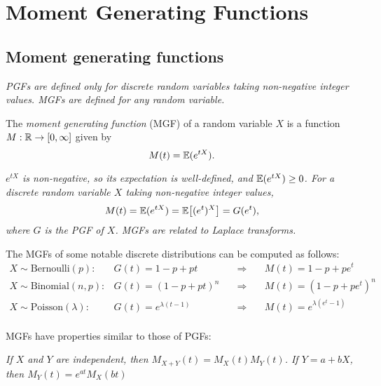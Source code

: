 \chapter{Moment Generating Functions}\label{chap:mgfs}
\section{Moment generating functions}

\bit
\it PGFs are defined only for discrete random variables taking non-negative integer values. 
\it MGFs are defined for any random variable.
\eit

\begin{definition}
The \emph{moment generating function} (MGF) of a random variable $X$ is a function $M:\mathbb{R}\to [0,\infty]$ given by
\[
M(t) = \mathbb{E}(e^{tX}).
\] 
\end{definition}

\begin{remark}
\ben
\it $e^{tX}$ is non-negative, so its expectation is well-defined, and $\mathbb{E}(e^{tX})\geq 0$.
\it
For a discrete random variable $X$ taking non-negative integer values, 
\[
M(t) = \mathbb{E}(e^{tX}) = \mathbb{E}\big[(e^t)^X\big] = G(e^t),
\]
where $G$ is the PGF of $X$.
\it 
MGFs are related to \emph{Laplace transforms}.
\een
\end{remark}

\begin{example}
The MGFs of some notable discrete distributions can be computed as follows:
\[
\begin{array}{llll}
X\sim\text{Bernoulli}(p):\quad	& G(t) = 1 - p + pt\quad	&\quad\Rightarrow\quad & M(t) =  1 - p + pe^t		\\[2ex]
X\sim\text{Binomial}(n,p):		& G(t) = (1-p+pt)^n			&\quad\Rightarrow\quad & M(t) = (1 - p + pe^t)^n	\\[2ex]
X\sim\text{Poisson}(\lambda):	& G(t) = e^{\lambda(t-1)}	&\quad\Rightarrow\quad & M(t) = e^{\lambda(e^t-1)}	\\ 
\end{array}
\]
\end{example}

MGFs have properties similar to those of PGFs:
\begin{theorem}
\ben
\it If $X$ and $Y$ are independent, then $M_{X+Y}(t) = M_X(t)M_Y(t)$.
\it If $Y = a + bX$, then $M_Y(t) = e^{at} M_X(bt)$
\een
\end{theorem}

